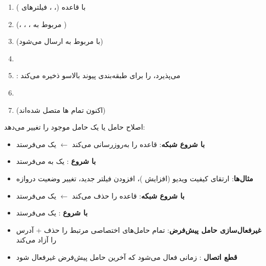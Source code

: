 \begin{enumerate}
\def\labelenumi{\arabic{enumi}.}
\tightlist
\item
   با قاعده  (، ، فیلترهای )
\item
   (، ، ،  مربوط به )
\item
   (با  مربوط به  ارسال می‌شود)
\item
\item
  : می‌پذیرد،  را برای طبقه‌بندی پیوند بالاسو ذخیره می‌کند
\item
\item
   (اکنون تمام ها متصل شده‌اند)
\end{enumerate}


اصلاح حامل  یا  یک حامل موجود را تغییر می‌دهد:

\begin{itemize}
\tightlist
\item
  \textbf{با شروع شبکه}:  قاعده  را به‌روزرسانی می‌کند \ensuremath{\leftarrow}  یک  می‌فرستد
\item
  \textbf{با شروع }:  یک  به  می‌فرستد
\item
  \textbf{مثال‌ها}: ارتقای کیفیت ویدیو (افزایش )، افزودن فیلتر  جدید، تغییر وضعیت دروازه
\end{itemize}


\begin{itemize}
\tightlist
\item
  \textbf{با شروع شبکه}:  قاعده  را حذف می‌کند \ensuremath{\leftarrow}  یک  می‌فرستد
\item
  \textbf{با شروع }:  یک  می‌فرستد
\item
  \textbf{غیرفعال‌سازی حامل پیش‌فرض}: تمام حامل‌های اختصاصی مرتبط را حذف + آدرس  را آزاد می‌کند
\item
  \textbf{قطع اتصال }: زمانی فعال می‌شود که آخرین حامل پیش‌فرض غیرفعال شود
\end{itemize}

